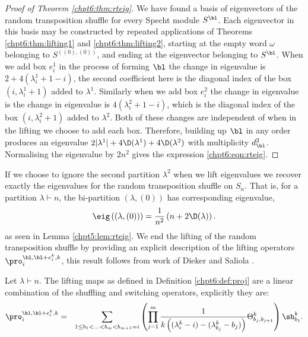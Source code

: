 \documentclass[11pt]{report}
\begin{document}
\begin{proof}[Proof of Theorem \ref{chpt6:thm:rteig}]
	We have found a basis of eigenvectors of the random transposition shuffle for every Specht module $S^{\bl}$. Each eigenvector in this basis may be constructed by repeated applications of Theorems \ref{chpt6:thm:lifting1} and \ref{chpt6:thm:lifting2}, starting at the empty word $\omega$ belonging to $S^{((0),(0))}$, and ending at the eigenvector belonging to $S^{\bl}$. When we add box $e_{i}^{1}$ in the process of forming $\bl$ the change in eigenvalue is $2 + 4(\lambda^{1}_{i}+1-i)$, the second coefficient here is the diagonal index of the box $(i,\lambda_{i}^{1} +1)$ added to $\lambda^{1}$. Similarly when we add box $ e_{i}^{2}$ the change in eigenvalue is the change in eigenvalue is $4(\lambda^{2}_{i}+1-i)$, which is the diagonal index of the box  $(i,\lambda_{i}^{2} +1)$ added to $\lambda^{2}$. Both of these changes are independent of when in the lifting we choose to add each box. Therefore, building up $\bl$ in any order produces an eigenvalue $2|\lambda^{1}| + 4\D(\lambda^{1}) + 4\D(\lambda^{2})$ with multiplicity $d_{\bl}^{2}$. Normalising the eigenvalue by $2n^{2}$ gives the expression \eqref{chpt6:eqn:rteig}.
	
	
	
	
	
	
	
	
\end{proof}

If we choose to ignore the second partition $\lambda^{2}$ when we lift eigenvalues we recover exactly the eigenvalues for the random transposition shuffle on $S_{n}$. That is, for a partition $\lambda \vdash n$, the bi-partition $(\lambda,(0))$ has corresponding eigenvalue,
\[\eig\left((\lambda,(0)) \right) = \frac{1}{n^{2}} \left( n + 2 \D(\lambda)\right) .\]
as seen in Lemma \ref{chpt5:lem:rteig}.
We end the lifting of the random transposition shuffle by  providing an explicit description of the lifting operators $\pro_{i}^{\bl,\bl+e_{i}^{k},k}$, this result follows from work of Dieker and Saliola \cite{dieker2018spectral}.

\begin{lemma}
	\label{chpt6:lem:liftingoperatorsdescription}
	Let $\lambda \vdash n$. The lifting maps as defined in Definition 
	\ref{chpt6:def:proj} are a linear combination of the shuffling and switching operators, explicitly they are:	
	\begin{eqnarray}
	\pro_{i}^{\bl,\bl+e_{i}^{k},k} & = & \sum_{1\leq b_{1} <\ldots <b_{m} <b_{m+1}=i} \left( \prod_{j=1}^{m} \frac{1}{k\left((\lambda_{i}^{k} -i) - (\lambda_{b_{j}}^{k} -b_{j}) \right)}\Theta_{b_{j},b_{j+1}}^{k} \right) \sh_{b_{1}}^{k}.	
	\end{eqnarray}
\end{lemma}
\end{document}
